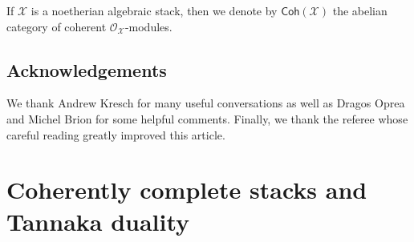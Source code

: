 \documentclass[a4paper]{amsart}
\theoremstyle{plain}
\theoremstyle{definition}
\theoremstyle{remark}
\numberwithin{equation}{section}
\newcommand\cX{\mathcal{X}}
\newcommand\oh{\mathcal{O}}
\newcommand\Coh{\mathsf{Coh}}
\begin{document}
If $\cX$ is a noetherian algebraic stack, then we denote by $\Coh(\cX)$ the abelian category of coherent $\oh_{\cX}$-modules.


\subsection*{Acknowledgements}  We thank Andrew Kresch for many useful conversations as well as Dragos Oprea and Michel Brion for some helpful comments.  Finally, we thank the referee whose careful reading greatly improved this article.


\section{Coherently complete stacks and Tannaka duality} \label{S:cc-tannaka}
\end{document}

